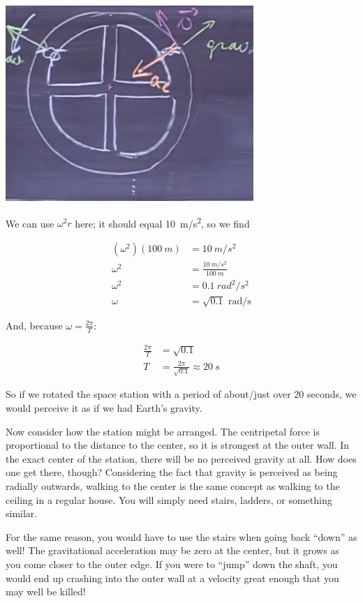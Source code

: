 \documentclass[12pt,a4paper]{report}
\begin{document}
\begin{center}
\includegraphics[scale=0.6]{Graphics/lec5_space_station}
\end{center}

We can use $\omega^2 r$ here; it should equal \SI{10}{m/s^2}, so we find

\begin{align}
(\omega^2)(\SI{100}{m}) &= \SI{10}{m/s^2}\\
\omega^2 &= \frac{\SI{10}{m/s^2}}{\SI{100}{m}}\\
\omega^2 &= \SI{0.1}{rad^2/s^2}\\
\omega &= \sqrt{0.1} \text{ rad/s}
\end{align}

And, because $\omega = \frac{2 \pi}{T}$:

\begin{align}
\frac{2 \pi}{T} &= \sqrt{0.1}\\
T &= \frac{2 \pi}{\sqrt{0.1}} \approx \SI{20}{s}
\end{align}

So if we rotated the space station with a period of about/just over 20 seconds, we would perceive it as if we had Earth's gravity.

Now consider how the station might be arranged. The centripetal force is proportional to the distance to the center, so it is strongest at the outer wall. In the exact center of the station, there will be no perceived gravity at all. How does one get there, though? Considering the fact that gravity is perceived as being radially outwards, walking to the center is the same concept as walking to the ceiling in a regular house. You will simply need stairs, ladders, or something similar.

For the same reason, you would have to use the stairs when going back ``down'' as well! The gravitational acceleration may be zero at the center, but it grows as you come closer to the outer edge. If you were to ``jump'' down the shaft, you would end up crashing into the outer wall at a velocity great enough that you may well be killed!
\end{document}
